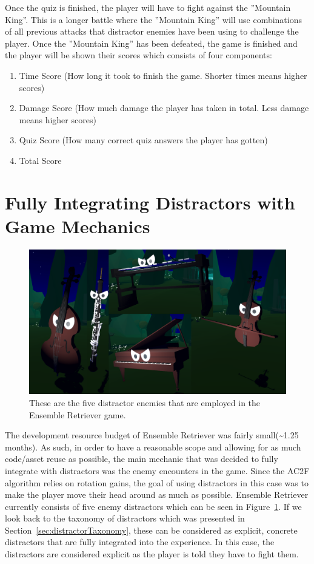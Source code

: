 Once the quiz is finished, the player will have to fight against the ''Mountain King''. This is a longer battle where the ''Mountain King'' will use combinations of all previous attacks that distractor enemies have been using to challenge the player. Once the ''Mountain King'' has been defeated, the game is finished and the player will be shown their scores which consists of four components:
\begin{enumerate}
    \item Time Score (How long it took to finish the game. Shorter times means higher scores)
    \item Damage Score (How much damage the player has taken in total. Less damage means higher scores)
    \item Quiz Score (How many correct quiz answers the player has gotten)
    \item Total Score
\end{enumerate}

\section{Fully Integrating Distractors with Game Mechanics}
\begin{figure}[tbph]
    \centering
    \includegraphics[width=1\textwidth]{figures/screenshots/Distractors.png}
    \caption[The Distractors of Ensemble Retriever]{These are the five distractor enemies that are employed in the Ensemble Retriever game.}
    \label{fig:allDistractors}
\end{figure}

The development resource budget of Ensemble Retriever was fairly small(\textasciitilde1.25 months). As such, in order to have a reasonable scope and allowing for as much code/asset reuse as possible, the main mechanic that was decided to fully integrate with distractors was the enemy encounters in the game. Since the AC2F algorithm relies on rotation gains, the goal of using distractors in this case was to make the player move their head around as much as possible. Ensemble Retriever currently consists of five enemy distractors which can be seen in Figure~\ref{fig:allDistractors}. If we look back to the taxonomy of distractors which was presented in Section~\ref{sec:distractorTaxonomy}, these can be considered as explicit, concrete distractors that are fully integrated into the experience. In this case, the distractors are considered explicit as the player is told they have to fight them. 


